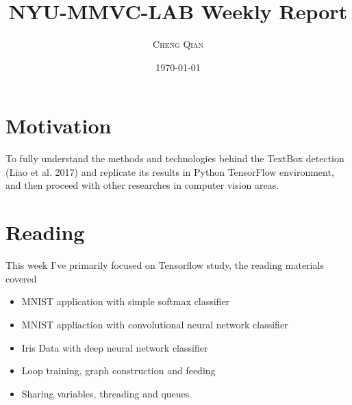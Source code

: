 \documentclass{article}
\title{NYU-MMVC-LAB Weekly Report} %
\author{\textsc{Cheng Qian}} %
\date{\today} %
\begin{document}
\maketitle %




\section{Motivation}

To fully understand the methods and technologies behind the TextBox detection (Liao et al. 2017) and replicate its results in Python TensorFlow environment, and then proceed with other researches in computer vision areas.




\section{Reading}

This week I've primarily focused on Tensorflow study, the reading materials covered
\begin{itemize}
	\item MNIST application with simple softmax classifier
	\item MNIST appliaction with convolutional neural network classifier
	\item Iris Data with deep neural network classifier
	\item Loop training, graph construction and feeding
	\item Sharing variables, threading and queues
\end{itemize}
\end{document}
